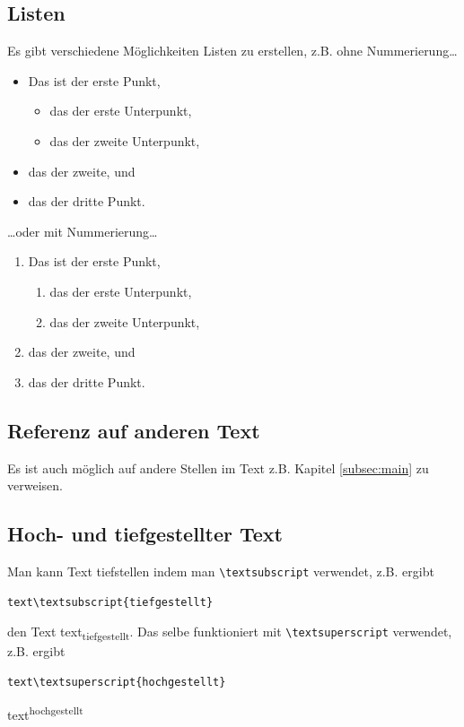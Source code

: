 \subsection{Listen}
Es gibt verschiedene Möglichkeiten Listen zu erstellen, z.B. ohne Nummerierung\dots
\begin{itemize}
   \item
      Das ist der erste Punkt,
      \begin{itemize}
         \item
            das der erste Unterpunkt,
         \item
            das der zweite Unterpunkt,
   \end{itemize}
   \item
      das der zweite, und
   \item
      das der dritte Punkt.
\end{itemize}
\dots oder mit Nummerierung\dots
\begin{enumerate}
   \item
      Das ist der erste Punkt,
      \begin{enumerate}
         \item
            das der erste Unterpunkt,
         \item
            das der zweite Unterpunkt,
      \end{enumerate}
   \item
      das der zweite, und
   \item
      das der dritte Punkt.
\end{enumerate}
\subsection{Referenz auf anderen Text}
Es ist auch möglich auf andere Stellen im Text z.B. Kapitel \ref{subsec:main} zu verweisen.
\subsection{Hoch- und tiefgestellter Text}
Man kann Text tiefstellen indem man \verb|\textsubscript| verwendet, z.B. ergibt
\begin{verbatim}
text\textsubscript{tiefgestellt}
\end{verbatim}
den Text text\textsubscript{tiefgestellt}.
Das selbe funktioniert mit \verb|\textsuperscript| verwendet, z.B. ergibt
\begin{verbatim}
text\textsuperscript{hochgestellt}
\end{verbatim}
text\textsuperscript{hochgestellt}

